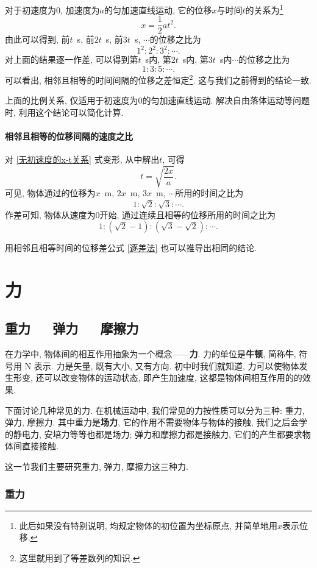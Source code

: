 \documentclass[11pt,a4paper]{ctexbook}
\newcommand{\bre}{\ \ \ }
\begin{document}
对于初速度为0, 加速度为$a$的匀加速直线运动, 它的位移$x$与时间$t$的关系为\footnote{此后如果没有特别说明, 均规定物体的初位置为坐标原点, 并简单地用$x$表示位移.}
\begin{equation}
    x = \frac12 at^2.
    \label{无初速度的x-t关系}
\end{equation}
由此可以得到, 前$t$\ s, 前$2t$\ s, 前$3t$\ s, $\cdots$的位移之比为
$$1^2:2^2:3^2: \cdots.$$
对上面的结果逐一作差, 可以得到第$t$\ s内, 第$2t$\ s内, 第$3t$\ s内$\cdots$的位移之比为
$$1:3:5: \cdots.$$
可以看出, 相邻且相等的时间间隔的位移之差恒定\footnote{这里就用到了等差数列的知识.}. 这与我们之前得到的结论一致.

上面的比例关系, 仅适用于初速度为0的匀加速直线运动. 解决自由落体运动等问题时, 利用这个结论可以简化计算.

\subsubsection{相邻且相等的位移间隔的速度之比}
对 \eqref{无初速度的x-t关系} 式变形, 从中解出$t$, 可得
$$t = \sqrt{\frac{2x}{a}}.$$
可见, 物体通过的位移为$x$\ m, $2x$\ m, $3x$\ m, $\cdots$所用的时间之比为
$$1: \sqrt{2}: \sqrt{3}: \cdots.$$
作差可知, 物体从速度为0开始, 通过连续且相等的位移所用的时间之比为
$$1:(\sqrt{2} - 1):(\sqrt{3}-\sqrt{2}): \cdots.$$

用相邻且相等时间的位移差公式 \eqref{逐差法} 也可以推导出相同的结论.

\chapter{力}

\section{重力\bre 弹力\bre 摩擦力}

在力学中, 物体间的相互作用抽象为一个概念——\textbf{力}. 力的单位是\textbf{牛顿}, 简称\textbf{牛},
符号用 N 表示. 力是矢量, 既有大小, 又有方向.
初中时我们就知道, 力可以使物体发生形变, 还可以改变物体的运动状态, 即产生加速度, 这都是物体间相互作用的的效果.

下面讨论几种常见的力.
在机械运动中, 我们常见的力按性质可以分为三种: 重力, 弹力, 摩擦力. 其中重力是\textbf{场力},
它的作用不需要物体与物体的接触, 我们之后会学的静电力, 安培力等等也都是场力; 弹力和摩擦力都是接触力, 它们的产生都要求物体间直接接触.

这一节我们主要研究重力, 弹力, 摩擦力这三种力.

\subsection{重力}
\end{document}
